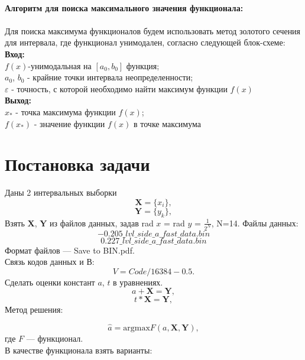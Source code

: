 \documentclass[10pt]{article}
\begin{document}
\vspace{0.5cm}
\\\textbf{Алгоритм для поиска максимального значения функционала:}\\\\
Для поиска максимума функционалов будем использовать метод золотого сечения для интервала, где функционал унимодален, согласно следующей блок-схеме:\\
\textbf{Вход:} 
\\$f(x)$-унимодальная на $[a_0,b_0]$ функция; 
\\$a_0$, $b_0$ - крайние точки интервала неопределенности;
\\$\varepsilon$ - точность, с которой необходимо найти максимум функции $f(x)$
\\
\textbf{Выход:} 
\\$x_*$ - точка максимума функции $f(x)$;
\\$f(x_*)$ - значение функции $f(x)$ в точке максимума

\section{Постановка задачи}
Даны 2 интервальных выборки
\begin{equation}
    \mathbf{X}=\{x_i\},
\end{equation}
\begin{equation}
    \mathbf{Y}=\{y_k\},
\end{equation}
Взять $\mathbf{X}$, $\mathbf{Y}$ из файлов данных, задав rad $x$ = rad $y$ = $\frac{1}{2^N}$, N=14.
Файлы данных:
\[−0.205\_lvl\_side\_a\_fast\_data.bin\]
\[0.227\_lvl\_side\_a\_fast\_data.bin\]
Формат файлов — Save to BIN.pdf.\\
Связь кодов данных и В:\\
\[V = Code/16384 − 0.5.\]
Сделать оценки констант $a$, $t$ в уравнениях.
\begin{equation}
    a+\mathbf{X}=\mathbf{Y},
\end{equation}
\begin{equation}
    t*\mathbf{X}=\mathbf{Y},
\end{equation}
Метод решения:

\begin{equation}
    \hat a = \text{argmax} F(a, \mathbf{X}, \mathbf{Y}),
\end{equation}
где \( F \) --- функционал.
\\
В качестве функционала взять варианты:
\end{document}
